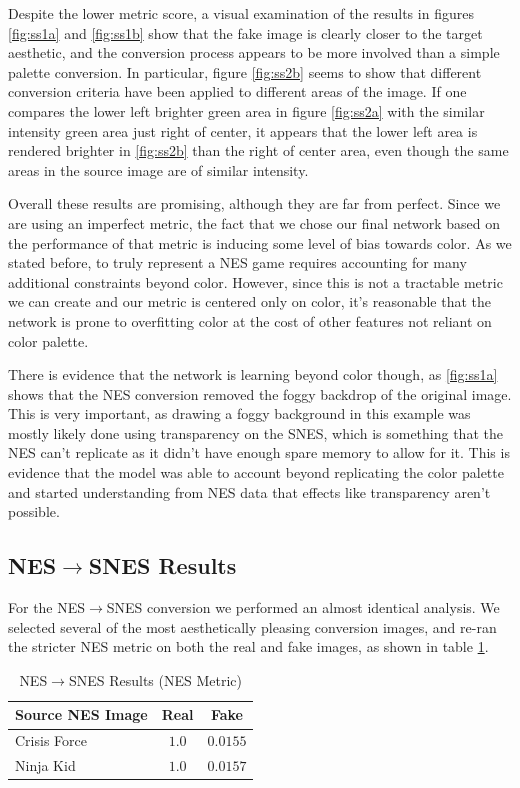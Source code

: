 \documentclass[10pt,twocolumn,letterpaper]{article}
\begin{document}
Despite the lower metric score, a visual examination of the results in figures \ref{fig:ss1a} and \ref{fig:ss1b} show that the fake image is clearly closer to the target aesthetic, and the conversion process appears to be more involved than a simple palette conversion.
In particular, figure \ref{fig:ss2b} seems to show that different conversion criteria have been applied to different areas of the image. If one compares the lower left brighter green area in figure \ref{fig:ss2a} with the similar intensity green area just right of center, it appears that the lower left area is rendered brighter in \ref{fig:ss2b} than the right of center area, even though the same areas in the source image are of similar intensity.

Overall these results are promising, although they are far from perfect. Since we are using an imperfect metric, the fact that we chose our final network based on the performance of that metric is inducing some level of bias towards color. As we stated before, to truly represent a NES game requires accounting for many additional constraints beyond color. However, since this is not a tractable metric we can create and our metric is centered only on color, it's reasonable that the network is prone to overfitting color at the cost of other features not reliant on color palette.

There is evidence that the network is learning beyond color though, as \ref{fig:ss1a} shows that the NES conversion removed the foggy backdrop of the original image. This is very important, as drawing a foggy background in this example was mostly likely done using transparency on the SNES, which is something that the NES can't replicate as it didn't have enough spare memory to allow for it. This is evidence that the model was able to account beyond replicating the color palette and started understanding from NES data that effects like transparency aren't possible.

\subsection{NES$\rightarrow$SNES Results}

For the NES$\rightarrow$SNES conversion we performed an almost identical analysis. We selected several of the most aesthetically pleasing conversion images, and re-ran the stricter NES metric on both the real and fake images, as shown in table \ref{tab:snesresults}.

\begin{table}[H]
   \begin{center}
      \begin{tabular}{|l|c|c|}
         \hline
         Source NES Image & Real  & Fake     \\
         \hline\hline
         Crisis Force     & $1.0$ & $0.0155$ \\
         Ninja Kid        & $1.0$ & $0.0157$ \\
         \hline
      \end{tabular}
   \end{center}
   \caption{NES$\rightarrow$SNES Results (NES Metric)}
   \label{tab:snesresults}
\end{table}
\end{document}
